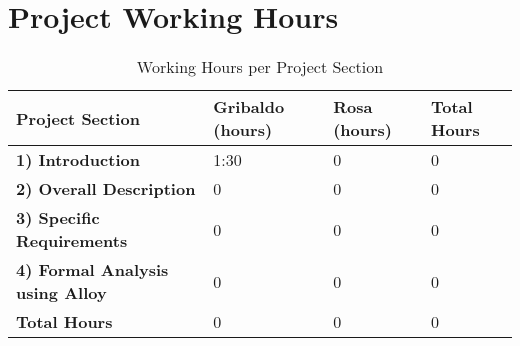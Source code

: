 \section*{Project Working Hours}

\begin{table}[ht!]
\centering
\begin{tabular}{|p{6cm}|p{2.5cm}|p{2.5cm}|p{2.5cm}|}
\hline
\textbf{Project Section} & \textbf{Gribaldo (hours)} & \textbf{Rosa (hours)} & \textbf{Total Hours} \\
\hline
\textbf{ 1) Introduction}                   & 1:30   & 0   & 0   \\
\textbf{ 2) Overall Description}            & 0    & 0  & 0   \\
\textbf{ 3) Specific Requirements}          & 0     & 0   & 0   \\
\textbf{ 4) Formal Analysis using Alloy}    & 0     & 0      & 0   \\
\hline
\textbf{Total Hours}                        & 0     & 0     & 0   \\
\hline
\end{tabular}
\caption{Working Hours per Project Section}
\label{tab:working_hours}
\end{table}

\vspace*{\fill}
